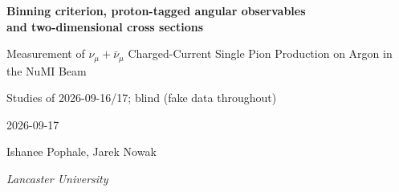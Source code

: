 
\usepackage{xr}



\newcommand{\GeVcc}{\,\text{GeV}\!/c}



\begin{titlepage}
\centering
\vspace*{2cm}
{\LARGE\bfseries Binning criterion, proton-tagged angular observables\\ and two-dimensional cross sections\par}
\vspace{0.5cm}
{\large Measurement of $\nu_\mu + \bar{\nu}_\mu$ Charged-Current Single Pion
Production on Argon in the NuMI Beam\par}
\vspace{0.8cm}
{\large Studies of 2026-09-16/17; blind (fake data throughout)\par}
\vspace{0.5cm}
{\normalsize 2026-09-17\par}
\vspace{1.5cm}
{\large Ishanee Pophale, Jarek Nowak\par}
\vspace{0.5cm}
{\normalsize\textit{Lancaster University}\par}
\vspace{2cm}


\end{titlepage}
